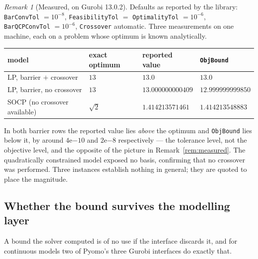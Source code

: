 \documentclass[11pt]{article}
\theoremstyle{plain}
\theoremstyle{remark}
\newtheorem{remark}[lemma]{Remark}
\begin{document}
\begin{remark}[Measured, on Gurobi 13.0.2]\label{rem:gurobi}
Defaults as reported by the library: \texttt{BarConvTol} $=10^{-8}$,
\texttt{FeasibilityTol} $=$ \texttt{OptimalityTol} $=10^{-6}$,
\texttt{BarQCPConvTol} $=10^{-6}$, \texttt{Crossover} automatic.  Three
measurements on one machine, each on a problem whose optimum is known
analytically.

\begin{center}
\begin{tabular}{llll}
\toprule
model & exact optimum & reported value & \texttt{ObjBound} \\
\midrule
LP, barrier $+$ crossover & $13$        & $13.0$              & $13.0$ \\
LP, barrier, no crossover & $13$        & $13.000000000409$   & $12.999999999850$ \\
SOCP (no crossover available) & $\sqrt2$ & $1.414213571461$    & $1.414213548883$ \\
\bottomrule
\end{tabular}
\end{center}

In both barrier rows the reported value lies \emph{above} the optimum and
\texttt{ObjBound} lies below it, by around $4\mathrm{e}{-10}$ and
$2\mathrm{e}{-8}$ respectively --- the tolerance level, not the objective
level, and the opposite of the picture in Remark~\ref{rem:measured}.  The
quadratically constrained model exposed no basis, confirming that no crossover
was performed.  Three instances establish nothing in general; they are quoted
to place the magnitude.
\end{remark}

\subsection{Whether the bound survives the modelling layer}

A bound the solver computed is of no use if the interface discards it, and for
continuous models two of Pyomo's three Gurobi interfaces do exactly that.
\end{document}
